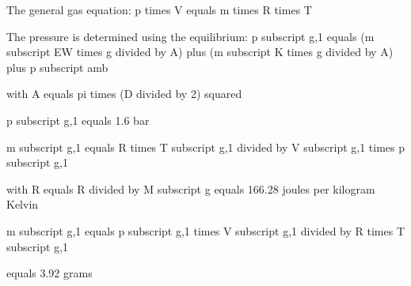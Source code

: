 The general gas equation:  
p times V equals m times R times T  

The pressure is determined using the equilibrium:  
p subscript g,1 equals (m subscript EW times g divided by A) plus (m subscript K times g divided by A) plus p subscript amb  

with A equals pi times (D divided by 2) squared  

p subscript g,1 equals 1.6 bar  

m subscript g,1 equals R times T subscript g,1 divided by V subscript g,1 times p subscript g,1  

with R equals R divided by M subscript g equals 166.28 joules per kilogram Kelvin  

m subscript g,1 equals p subscript g,1 times V subscript g,1 divided by R times T subscript g,1  

equals 3.92 grams